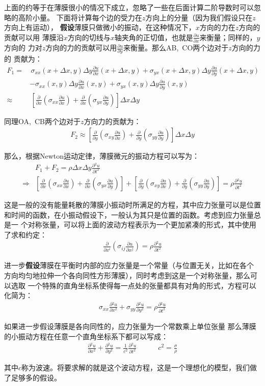 \documentclass[a4paper]{ctexart}
\newcommand{\pdv}[2]{\frac{\partial{#1}}{\partial{#2}}}
\begin{document}
	\par 上面的约等于在薄膜很小的情况下成立，忽略了一些在后面计算二阶导数时可以忽略的高阶小量。
	下面将计算每个边的受力在$z$方向上的分量（因为我们假设只在$z$方向上有运动），
	\textbf{假设}薄膜只做微小的振动，在这种情况下，$x$方向的力在$z$方向的贡献可以用
	薄膜沿$x$方向的切线与$x$轴夹角的正切值，也就是$\pdv{u}{x}$来衡量；同样的，$y$方向的
	力对$z$方向的力的贡献可以用$\pdv{u}{y}$来衡量。那么AB,\, CO两个边对于$z$方向的力的
	贡献为：
	\begin{align}
		F_{1} =& \,\sigma_{xx}(x+\Delta x, y)\Delta y\pdv{u}{x}(x+\Delta x, y) + \sigma_{yx}(x+\Delta x, y)\Delta y\pdv{u}{y}(x+\Delta x, y)\\
		&- \sigma_{xx}(x, y)\Delta y\pdv{u}{x}(x, y) + \sigma_{yx}(x, y)\Delta y\pdv{u}{y}(x, y)\\
		\approx& \, \left[\pdv{}{x}\left(\sigma_{xx}\pdv{u}{x}\right) + \pdv{}{x}\left(\sigma_{yx}\pdv{u}{y}\right)\right]\Delta x\Delta y
	\end{align}
	\par 同理OA,\, CB两个边对于$z$方向力的贡献为：
	\begin{align}
		F_{2} \approx  \left[\pdv{}{y}\left(\sigma_{xy}\pdv{u}{x}\right) + \pdv{}{y}\left(\sigma_{yy}\pdv{u}{y}\right)\right]\Delta x\Delta y
	\end{align}
	\par 那么，根据Newton运动定律，薄膜微元的振动方程可以写为：
	\begin{align}
		&F_{1} + F_{2} = \rho \Delta x\Delta y \pdv{^{2}u}{t^{2}}\\
		\Rightarrow& \left[\pdv{}{x}\left(\sigma_{xx}\pdv{u}{x}\right) + \pdv{}{x}\left(\sigma_{yx}\pdv{u}{y}\right)\right] + 
		\left[\pdv{}{y}\left(\sigma_{xy}\pdv{u}{x}\right) + \pdv{}{y}\left(\sigma_{yy}\pdv{u}{y}\right)\right] = \rho\pdv{^2 u}{t^{2}}
	\end{align}
	\par 这是一般的没有能量耗散的薄膜小振动时所满足的方程，其中应力张量可以是位置
	和时间的函数，在小振动假设下，一般认为其只是位置的函数。考虑到应力张量总是一
	个对称张量\cite{b}，可以将上面的波动方程表示为一个更加紧凑的形式，其中使用了求和约定：
	\begin{align}
		\pdv{}{x^{i}}\left(\sigma_{ij}\pdv{u}{x^{j}}\right) = \rho\pdv{^2 u}{t^2}
	\end{align}
	
	进一步\textbf{假设}薄膜在平衡时内部的应力张量是一个常量（与位置无关，比如在各个
	方向均匀地拉伸一个各向同性方形薄膜），同时考虑到这是一个对称张量，那么可以选取
	一个特殊的直角坐标系使得每一点处的张量都具有对角的形式，方程可以化简为：
	\begin{align}
		\sigma_{xx}\pdv{^{2}u}{x^{2}} + \sigma_{yy}\pdv{^2 u}{y^2} = \rho \pdv{^{2}u}{t^{2}}
	\end{align}
	\par 如果进一步假设薄膜是各向同性的，应力张量为一个常数乘上单位张量
	那么薄膜的小振动方程在任意一个直角坐标系下都可以写成：
	\begin{align}
		\pdv{^2 u}{x^2} + \pdv{^{2}u}{y^{2}} = \frac{1}{c^{2}}\pdv{^2 u}{t^2}\quad\quad\quad c^2 = \frac{\sigma}{\rho}
		\label{wave eq}
	\end{align}
	\par 其中$c$称为波速。将要求解的就是这个波动方程，这是一个理想化的模型，我们做了足够多的假设。
\end{document}
